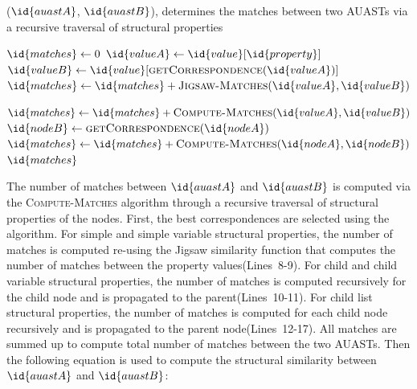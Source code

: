 \begin{algorithm}
  \caption{($\id{auastA}$, $\id{auastB}$), determines the matches between two AUASTs via a recursive traversal of structural properties}
  \label{computeMatches}
  \begin{algorithmic}[1]
  \ComputeMatch
  	   \EndIf
         \State $\id{matches} \gets 0$
	\State $\id{valueA} \gets \id{value}[\id{property}]$
	\State $\id{valueB} \gets \id{value}[\func{getCorrespondence}(\id{valueA})]$
 \State $\id{matches} \gets  \id{matches} + \func{Jigsaw-Matches}(\id{valueA}, \id{valueB})$ 	
	
	          \State $\id{matches} \gets  \id{matches} +\func{Compute-Matches}(\id{valueA},\id{valueB})$		 
		\State $\id{nodeB} \gets \func{getCorrespondence}(\id{nodeA})$
	 \State $\id{matches} \gets  \id{matches} + \func{Compute-Matches}(\id{nodeA}, \id{nodeB})$
	  \EndFor 	
	   \EndIf
       \EndFor 	
	\Return $\id{matches}$
  \end{algorithmic}
\end{algorithm}


The number of matches between $\id{auastA}$ and $\id{auastB}$ is computed via the \textsc{Compute-Matches} algorithm through a recursive traversal of structural properties of the nodes. First, the best correspondences are selected using the  algorithm. For simple and simple variable structural properties, the number of matches is computed re-using the Jigsaw similarity function that computes the number of matches between the property values(Lines~8-9). For child and child variable structural properties, the number of matches is computed recursively for the child node and is propagated to the parent(Lines~10-11). For child list structural properties, the number of matches is computed for each child node recursively and is propagated to the parent node(Lines~12-17). All matches are summed up to compute total number of matches between the two AUASTs. Then the following equation is used to compute the structural similarity between $\id{auastA}$ and $\id{auastB}$:

